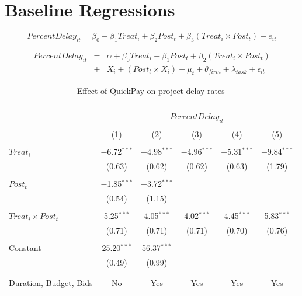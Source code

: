 \documentclass[
]{article}
\begin{document}
\hypertarget{baseline-regressions}{%
\section{Baseline Regressions}\label{baseline-regressions}}

\[ PercentDelay_{it} = \beta_0 + \beta_1 Treat_i + \beta_2 Post_t + \beta_3 (Treat_i \times Post_t) + e_{it}\]

\[ \begin{aligned} PercentDelay_{it} &=& \alpha+\beta_0 Treat_i + \beta_1 Post_t + \beta_2 (Treat_i \times Post_t)\\
&+&  X_i + (Post_t \times X_i) + \mu_t + \theta_{firm} + \lambda_{task}+ \epsilon_{it}
\end{aligned}\]

\begin{table}[H] \centering 
  \caption{Effect of QuickPay on project delay rates} 
  \label{} 
\small 
\begin{tabular}{@{\extracolsep{-2pt}}lccccc} 
\\[-1.8ex]\hline 
\hline \\[-1.8ex] 
\\[-1.8ex] & \multicolumn{5}{c}{$PercentDelay_{it}$} \\ 
\\[-1.8ex] & (1) & (2) & (3) & (4) & (5)\\ 
\hline \\[-1.8ex] 
 $Treat_i$ & $-$6.72$^{***}$ & $-$4.98$^{***}$ & $-$4.96$^{***}$ & $-$5.31$^{***}$ & $-$9.84$^{***}$ \\ 
  & (0.63) & (0.62) & (0.62) & (0.63) & (1.79) \\ 
  & & & & & \\ 
 $Post_t$ & $-$1.85$^{***}$ & $-$3.72$^{***}$ &  &  &  \\ 
  & (0.54) & (1.15) &  &  &  \\ 
  & & & & & \\ 
 $Treat_i \times Post_t$ & 5.25$^{***}$ & 4.05$^{***}$ & 4.02$^{***}$ & 4.45$^{***}$ & 5.83$^{***}$ \\ 
  & (0.71) & (0.71) & (0.71) & (0.70) & (0.76) \\ 
  & & & & & \\ 
 Constant & 25.20$^{***}$ & 56.37$^{***}$ &  &  &  \\ 
  & (0.49) & (0.99) &  &  &  \\ 
  & & & & & \\ 
\hline \\[-1.8ex] 
Duration, Budget, Bids & No & Yes & Yes & Yes & Yes \\ 

\end{tabular}
\end{table}
\end{document}
